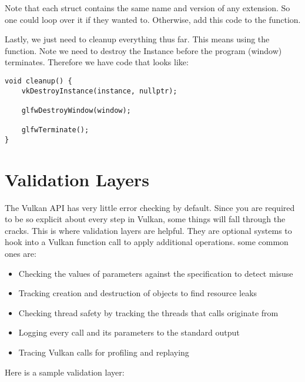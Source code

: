 \par Note that each  struct contains the same name and version of any extension. So one could loop over it if they wanted to. Otherwise, add this code to the  function.

\par Lastly, we just need to cleanup everything thus far. This means using the  function. Note we need to destroy the Instance before the program (window) terminates. Therefore we have code that looks like:

\begin{center}
\begin{minipage}{0.95\linewidth}
\begin{lstlisting}
void cleanup() {
    vkDestroyInstance(instance, nullptr);

    glfwDestroyWindow(window);

    glfwTerminate();
}
\end{lstlisting}
\end{minipage}
\end{center}

\section*{Validation Layers}

\par The Vulkan API has very little error checking by default. Since you are required to be so explicit about every step in Vulkan, some things will fall through the cracks. This is where validation layers are helpful. They are optional systems to hook into a Vulkan function call to apply additional operations. some common ones are:
\begin{itemize}
    \item Checking the values of parameters against the specification to detect misuse
    \item Tracking creation and destruction of objects to find resource leaks
    \item Checking thread safety by tracking the threads that calls originate from
    \item Logging every call and its parameters to the standard output
    \item Tracing Vulkan calls for profiling and replaying
\end{itemize}

\par Here is a sample validation layer:

